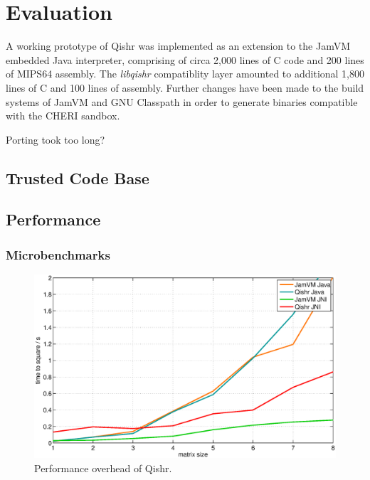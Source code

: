 \documentclass[a4paper,12pt,twoside,openright]{report}
\newcommand{\tool}[1]{\emph{#1}}
\newcommand{\lib}[1]{\tool{lib#1}}
\begin{document}
\chapter{Evaluation} 

A working prototype of Qishr was implemented as an extension to the JamVM embedded Java interpreter, comprising of circa 2,000 lines of C code and 200 lines of MIPS64 assembly. The \lib{qishr} compatiblity layer amounted to additional 1,800 lines of C and 100 lines of assembly. Further changes have been made to the build systems of JamVM and GNU Classpath in order to generate binaries compatible with the CHERI sandbox.

Porting took too long?

\section{Trusted Code Base}



\section{Performance}

\subsection{Microbenchmarks}

\begin{figure}
	\centering
	\includegraphics[width=1.1\textwidth]{graph_matrix.eps}
	\caption{Performance overhead of Qishr.}
\end{figure}
\end{document}
